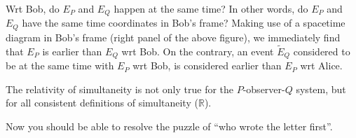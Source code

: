 {{		
		\item Wrt Bob, do $E_P$ and $E_Q$ happen at the same time? In other words, do $E_P$ and $E_Q$ have the same time coordinates in Bob's frame? Making use of a spacetime diagram in Bob's frame (right panel of the above figure), we immediately find that $E_P$ is earlier than $E_Q$ wrt Bob. On the contrary, an event $\widetilde{E}_Q$ considered to be at the same time with $E_P$ wrt Bob, is considered earlier than $E_P$ wrt Alice.
		
		\item The relativity of simultaneity is not only true for the $P$-observer-$Q$ system, but for all consistent definitions of simultaneity ($\mathbb{R}$).
	}
}
Now you should be able to resolve the puzzle of ``who wrote the letter first''.

